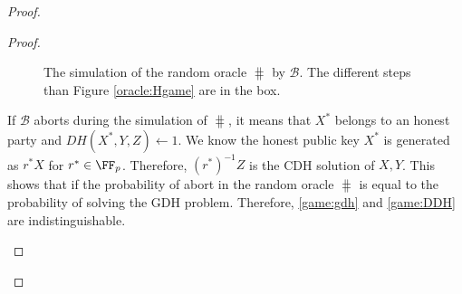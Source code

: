 \begin{proof}
\begin{proof}
\begin{enumerate}[label={{Game} }{{\arabic*}}, start = 0]
			\begin{figure}
				\centering
				
				\noindent{}	
				\caption{The simulation of the random oracle $ \hash $ by $ \mathcal{B} $. The different steps than Figure \ref{oracle:Hgame} are in the box.}
				\label{oracle:HbyB}
			\end{figure}
			
			If $ \mathcal{B} $ aborts during the simulation of $ \hash $, it means that $ X^* $ belongs to an honest party and $ DH(X^*,Y,Z) \leftarrow 1 $. We know the honest public key $ X^* $ is generated as $ r^*X $ for $ r^* \in \FF_p $. Therefore, $ (r^*)^{-1}Z $ is the CDH solution of $ X,Y $. This shows that if the probability of abort in the random oracle $ \hash $ is equal to the probability of solving the GDH problem. Therefore, \ref{game:gdh} and \ref{game:DDH} are indistinguishable.
			

\end{enumerate}
\end{proof}
\end{proof}
